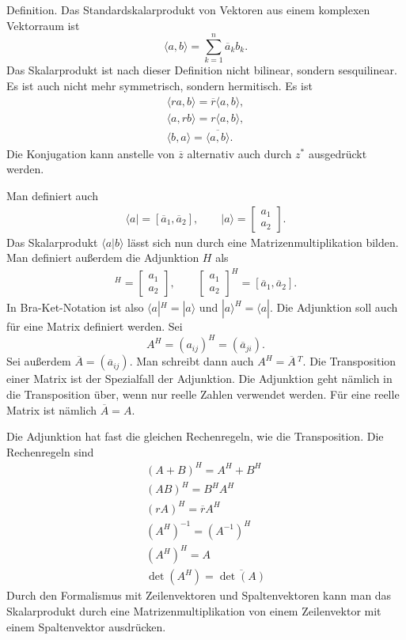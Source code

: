 \documentclass[a4paper,10pt,fleqn,twocolumn,twoside]{article}
\begin{document}
Definition. Das Standardskalarprodukt von Vektoren aus einem komplexen
Vektorraum ist
\[\langle a,b\rangle = \sum_{k=1}^n \overline a_kb_k.\]
Das Skalarprodukt ist nach dieser Definition nicht bilinear, sondern
sesquilinear. Es ist auch nicht mehr symmetrisch, sondern hermitisch.
Es ist
\begin{gather*}
\langle ra,b\rangle = \overline r\langle a,b\rangle,\\
\langle a,rb\rangle = r\langle a,b\rangle,\\
\langle b,a\rangle = \overline{\langle a,b\rangle}.
\end{gather*}
Die Konjugation kann anstelle von \(\overline z\) alternativ auch
durch \(z^\ast\) ausgedrückt werden.

Man definiert auch
\begin{gather*}
\langle a| = [\overline a_1,\overline a_2],\qquad
|a\rangle = \begin{bmatrix}a_1\\ a_2\end{bmatrix}.
\end{gather*}
Das Skalarprodukt \(\langle a|b\rangle\) lässt sich nun durch eine
Matrizenmultiplikation bilden. Man definiert außerdem die
Adjunktion \(H\) als
\begin{gather*}
[\overline a_1,\overline a_2]^H
= \begin{bmatrix}a_1\\ a_2\end{bmatrix},\qquad
\begin{bmatrix}a_1\\ a_2\end{bmatrix}^H
= [\overline a_1,\overline a_2].
\end{gather*}
In Bra-Ket-Notation ist also \(\langle a|^H=|a\rangle\) und
\(|a\rangle^H=\langle a|\). Die Adjunktion soll auch für eine Matrix
definiert werden. Sei
\[A^H = (a_{ij})^H = (\overline a_{ji}).\]
Sei außerdem \(\overline A=(\overline a_{ij})\). Man schreibt dann
auch \(A^H = \overline A\,{}^T\). Die Transposition einer Matrix ist
der Spezialfall der Adjunktion. Die Adjunktion geht nämlich in die
Transposition über, wenn nur reelle Zahlen verwendet werden. Für eine
reelle Matrix ist nämlich \(\overline A=A\).

Die Adjunktion hat fast die gleichen Rechenregeln, wie die
Transposition. Die Rechenregeln sind
\begin{gather*}
(A+B)^H = A^H+B^H\\
(AB)^H = B^H A^H\\
(rA)^H = \overline r A^H\\
(A^H)^{-1} = (A^{-1})^H\\
(A^H)^H = A\\
\det(A^H) = \overline{\det(A)}
\end{gather*}
Durch den Formalismus mit Zeilenvektoren und Spaltenvektoren kann man
das Skalarprodukt durch eine Matrizenmultiplikation von einem
Zeilenvektor mit einem Spaltenvektor ausdrücken.
\end{document}
